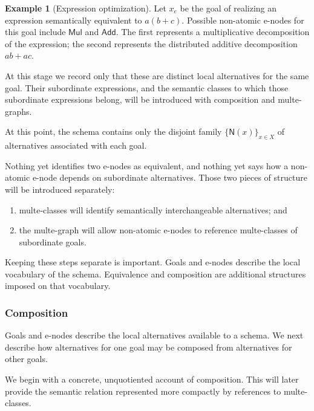 \documentclass[sigconf,nonacm]{acmart}
\theoremstyle{definition}
\newtheorem{example}[definition]{Example}
\theoremstyle{plain}
\theoremstyle{remark}
\begin{document}
\begin{example}[Expression optimization]
Let \(x_e\) be the goal of realizing an expression semantically
equivalent to \(a(b+c)\).  Possible non-atomic e-nodes for this goal
include \(\mathsf{Mul}\) and \(\mathsf{Add}\).  The first represents
a multiplicative decomposition of the expression; the second
represents the distributed additive decomposition \(ab+ac\).

At this stage we record only that these are distinct local alternatives
for the same goal.  Their subordinate expressions, and the semantic
classes to which those subordinate expressions belong, will be
introduced with composition and multe-graphs.
\end{example}

At this point, the schema contains only the disjoint family
\(\{\mathsf{N}(x)\}_{x\in X}\) of alternatives associated with each
goal.

Nothing yet identifies two e-nodes as equivalent, and nothing yet says
how a non-atomic e-node depends on subordinate alternatives.  Those two
pieces of structure will be introduced separately:

\begin{enumerate}
\item multe-classes will identify semantically interchangeable
      alternatives; and
\item the multe-graph will allow non-atomic e-nodes to reference
      multe-classes of subordinate goals.
\end{enumerate}

Keeping these steps separate is important.  Goals and e-nodes describe
the local vocabulary of the schema.  Equivalence and composition are
additional structures imposed on that vocabulary.

\subsubsection{Composition}
\label{sec:composition}

Goals and e-nodes describe the local alternatives available to a
schema.  We next describe how alternatives for one goal may be composed
from alternatives for other goals.

We begin with a concrete, unquotiented account of composition.  This
will later provide the semantic relation represented more compactly by
references to multe-classes.
\end{document}
